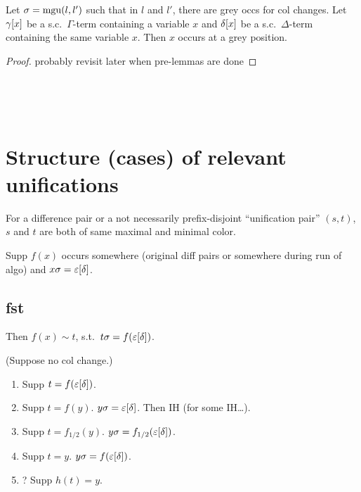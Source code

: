 \documentclass[,%
	paper=a4,%
	DIV11, %
	twoside=false,%
	liststotoc,
	bibtotoc,
	draft=false,%
	numbers=noendperiod
]{scrartcl}
\begin{document}
\begin{clemma}
	Let $\sigma = \operatorname{mgu}(l, l')$ such that in $l$ and $l'$, there are grey occs for col changes.
	Let $\gamma[x]$ be a s.c.\ $\Gamma$-term containing a variable $x$ and $\delta[x]$ be a s.c.\ $\Delta$-term containing the same variable $x$.
	Then $x$ occurs at a grey position.
\end{clemma}
\begin{proof}
	probably revisit later when pre-lemmas are done

\end{proof}

~

~





\section{Structure (cases) of relevant unifications} 

\begin{lemma}
	For a difference pair or a not necessarily prefix-disjoint ``unification pair'' $(s, t)$, $s$ and $t$ are both of same maximal and minimal color.
\end{lemma}

Supp $f(x)$ occurs somewhere (original diff pairs or somewhere during run of algo) and $x\sigma =\nolinebreak \varepsilon\occ{\delta}$.



\subsection{fst}

Then $f(x) \sim t$, s.t.\ $t\sigma = f(\varepsilon[\delta])$.

(Suppose no col change.)

\begin{enumerate}
	\item Supp $t = f(\varepsilon[\delta])$. \checkmark
	\item Supp $t = f(y)$.
		$y\sigma = \varepsilon[\delta]$.
		Then IH (for some IH\dots).
	\item Supp $t = f_{1/2}(y)$.
		$y\sigma = f_{1/2}(\varepsilon[\delta])$.
	\item Supp $t = y$.
		$y\sigma = f(\varepsilon[\delta])$.
	\item ? Supp $h(t) = y$.
\end{enumerate}
\end{document}
